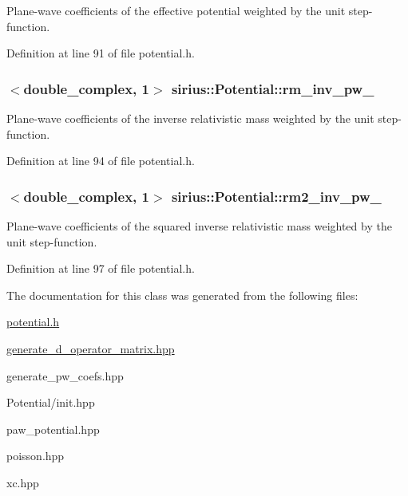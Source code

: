 Plane-\/wave coefficients of the effective potential weighted by the unit step-\/function. 



Definition at line 91 of file potential.\+h.

\hypertarget{classsirius_1_1_potential_a681931c08f11ddea4b3709280d7b309d}{}
\subsubsection[{rm\+\_\+inv\+\_\+pw\+\_\+}]{$<$double\+\_\+complex, 1$>$ sirius\+::\+Potential\+::rm\+\_\+inv\+\_\+pw\+\_\+\hspace{0.3cm}{\ttfamily [private]}}\label{classsirius_1_1_potential_a681931c08f11ddea4b3709280d7b309d}


Plane-\/wave coefficients of the inverse relativistic mass weighted by the unit step-\/function. 



Definition at line 94 of file potential.\+h.

\hypertarget{classsirius_1_1_potential_a71c1a995bc68a97d48e004999cd2b8a0}{}
\subsubsection[{rm2\+\_\+inv\+\_\+pw\+\_\+}]{$<$double\+\_\+complex, 1$>$ sirius\+::\+Potential\+::rm2\+\_\+inv\+\_\+pw\+\_\+\hspace{0.3cm}{\ttfamily [private]}}\label{classsirius_1_1_potential_a71c1a995bc68a97d48e004999cd2b8a0}


Plane-\/wave coefficients of the squared inverse relativistic mass weighted by the unit step-\/function. 



Definition at line 97 of file potential.\+h.



The documentation for this class was generated from the following files\+:\begin{DoxyCompactItemize}
\item 
\hyperlink{potential_8h}{potential.\+h}\item 
\hyperlink{generate__d__operator__matrix_8hpp}{generate\+\_\+d\+\_\+operator\+\_\+matrix.\+hpp}\item 
generate\+\_\+pw\+\_\+coefs.\+hpp\item 
Potential/init.\+hpp\item 
paw\+\_\+potential.\+hpp\item 
poisson.\+hpp\item 
xc.\+hpp\end{DoxyCompactItemize}
